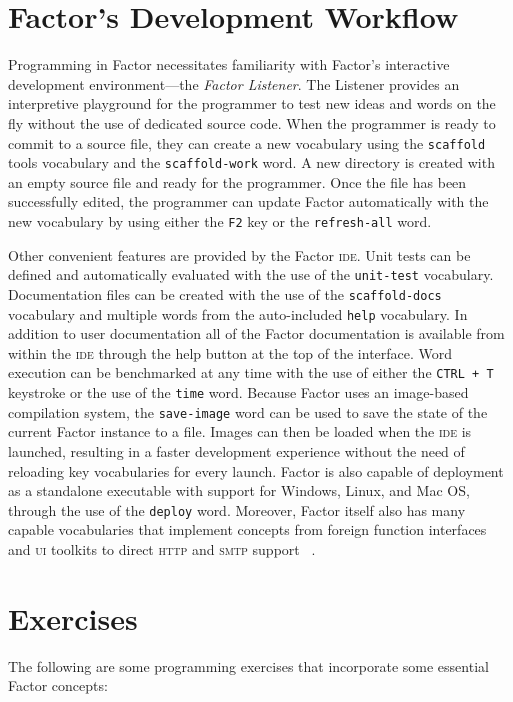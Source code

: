 \documentclass[sigconf]{acmart}
\begin{document}
\section{Factor's Development Workflow}
Programming in Factor necessitates familiarity with Factor's
interactive development environment---the \textit{Factor
Listener}. The Listener provides an interpretive playground
for the programmer to test new ideas and words on the fly without
the use of dedicated source code. When the programmer is ready
to commit to a source file, they can create a new vocabulary 
using the \texttt{scaffold} tools vocabulary and the
\texttt{scaffold-work} word. A new directory is created with an
empty source file and ready for the programmer. Once the file has
been successfully edited, the programmer can update Factor 
automatically with the new vocabulary by using either the 
\texttt{F2} key or the \texttt{refresh-all} word.

Other convenient features are provided by the Factor \textsc{ide}.
Unit tests can be defined and automatically evaluated with the
use of the \texttt{unit-test} vocabulary. Documentation files
can be created with the use of the \texttt{scaffold-docs}
vocabulary and multiple words from the auto-included \texttt{help}
vocabulary. In addition to user documentation all of the 
Factor documentation is available from within the \textsc{ide}
through the help button at the top of the interface. Word 
execution can be benchmarked at any time with the use of either 
the \verb|CTRL + T| keystroke or the use of the \texttt{time} word.
Because Factor uses an image-based compilation system, the 
\texttt{save-image} word can be used to save the state of the 
current Factor instance to a file. Images can then be loaded 
when the \textsc{ide} is launched, resulting in a faster development 
experience without the need of reloading key vocabularies for
every launch. Factor is also capable of deployment as a 
standalone executable with support for Windows,
Linux, and Mac OS, through the use of the \texttt{deploy} word.
Moreover, Factor itself also has many capable vocabularies that 
implement concepts from foreign function interfaces and \textsc{ui}
toolkits to direct \textsc{http} and \textsc{smtp} support
~\cite{pestov:Factor}.

\section{Exercises}

The following are some programming exercises that incorporate
some essential Factor concepts:
\end{document}
